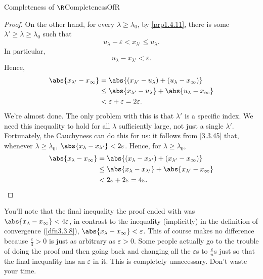 \begin{thm}{Completeness of $\R$}{CompletenessOfR}
\begin{proof}
On the other hand, for every $\lambda \geq \lambda _0$, by \cref{prp1.4.11}, there is some $\lambda '\geq \lambda \geq \lambda _0$ such that
\begin{equation}
u_\lambda -\varepsilon <x_{\lambda '}\leq u_\lambda .
\end{equation}
In particular,
\begin{equation}
u_\lambda -x_{\lambda '}<\varepsilon .
\end{equation}
Hence,
\begin{equation}
\begin{split}
\abs{x_{\lambda '}-x_\infty} & =\abs{(x_{\lambda '}-u_\lambda )+(u_\lambda -x_\infty )} \\
& \leq \abs{x_{\lambda '}-u_\lambda}+\abs{u_\lambda -x_\infty} \\
& <\varepsilon +\varepsilon =2\varepsilon .
\end{split}
\end{equation}
We're almost done.  The only problem with this is that $\lambda '$ is a specific index.  We need this inequality to hold for all $\lambda$ sufficiently large, not just a single $\lambda '$.  Fortunately, the Cauchyness can do this for us:  it follows from \eqref{3.3.45} that, whenever $\lambda \geq \lambda _0$, $\abs{x_\lambda -x_{\lambda '}}<2\varepsilon$.  Hence, for $\lambda \geq \lambda _0$,
\begin{equation}
\begin{split}
\abs{x_\lambda -x_\infty} & =\abs{(x_\lambda -x_{\lambda '})+(x_{\lambda '}-x_\infty)} \\
& \leq \abs{x_\lambda -x_{\lambda '}}+\abs{x_{\lambda '}-x_\infty} \\
& <2\varepsilon +2\varepsilon =4\varepsilon .
\end{split}
\end{equation}
\end{proof}
\begin{rmk}
You'll note that the final inequality the proof ended with was $\abs{x_\lambda -x_\infty}<4\varepsilon$, in contrast to the inequality (implicitly) in the definition of convergence (\cref{dfn3.3.8}), $\abs{x_\lambda -x_\infty}<\varepsilon$.  This of course makes no difference because $\frac{\varepsilon}{4}>0$ is just as arbitrary as $\varepsilon>0$.  Some people actually go to the trouble of doing the proof and then going back and changing all the $\varepsilon$s to $\frac{\varepsilon}{n}$s just so that the final inequality has an $\varepsilon$ in it.  This is completely unnecessary.  Don't waste your time.
\end{rmk}
\end{thm}

